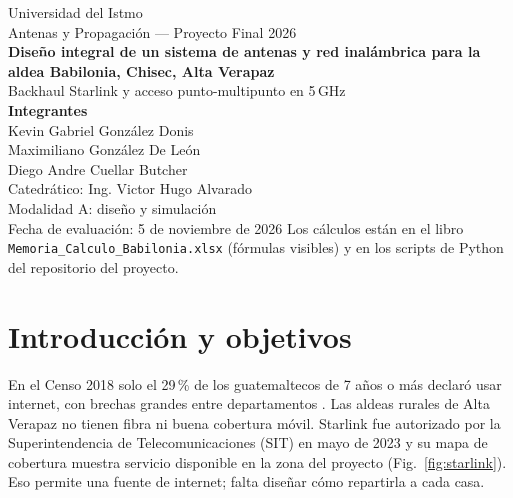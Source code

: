 \documentclass[11pt,a4paper]{article}
\begin{document}
\begin{titlepage}\centering\vspace*{1.5cm}
{\large Universidad del Istmo}\\[2pt]{\large Antenas y Propagación --- Proyecto Final 2026}\\[1.2cm]
{\LARGE\bfseries Diseño integral de un sistema de antenas y red inalámbrica para la aldea Babilonia, Chisec, Alta Verapaz}\\[0.6cm]
{\large Backhaul Starlink y acceso punto-multipunto en 5\,GHz}\\[1.5cm]
\textbf{Integrantes}\\[4pt]
Kevin Gabriel González Donis\\Maximiliano González De León\\Diego Andre Cuellar Butcher\\[1.2cm]
Catedrático: Ing. Victor Hugo Alvarado\\Modalidad A: diseño y simulación\\[1cm]
Fecha de evaluación: 5 de noviembre de 2026\vfill
{\small Los cálculos están en el libro \texttt{Memoria\_Calculo\_Babilonia.xlsx} (fórmulas visibles) y en los scripts de Python del repositorio del proyecto.}
\end{titlepage}

\begin{abstract}
Se diseña la conectividad de la aldea Babilonia (109 edificaciones, unos 380 habitantes), que no tiene red fija y donde Starlink tiene cobertura confirmada. Se propone una torre ventada de 30\,m en el claro central con un plato Starlink Performance como backhaul y tres sectores de 120\textdegree{} en 5\,GHz (radios Rocket Prism 5AC con antenas AM-5G16-120, canales de 20\,MHz en 5745, 5785 y 5825\,MHz). Cada casa tiene una CPE LiteBeam 5AC. El relieve es una hondonada casi plana; lo que limita el enlace es la vegetación, que se modela con la atenuación de Weissberger. Con copas de 20\,m, las 109 casas tienen enlace útil en bajada y subida, con margen mínimo de 16.4\,dB (bajada) y 13.4\,dB (subida) sobre BPSK. El sector más cargado usa el 48\,\% de su aire y el backhaul el 68\,\% en hora pico del año 3. Una simulación en CloudRF coincide con el cálculo dentro de 1.3\,dB sin vegetación. El CAPEX es de unos Q307\,mil (Q3{,}131 por hogar) y la tarifa de equilibrio es de Q132 por hogar al mes.
\end{abstract}

\section{Introducción y objetivos}
En el Censo 2018 solo el 29\,\% de los guatemaltecos de 7 años o más declaró usar internet, con brechas grandes entre departamentos \cite{F07}. Las aldeas rurales de Alta Verapaz no tienen fibra ni buena cobertura móvil. Starlink fue autorizado por la Superintendencia de Telecomunicaciones (SIT) en mayo de 2023 \cite{F02} y su mapa de cobertura muestra servicio disponible en la zona del proyecto (Fig.~\ref{fig:starlink}). Eso permite una fuente de internet; falta diseñar cómo repartirla a cada casa.
\end{document}
